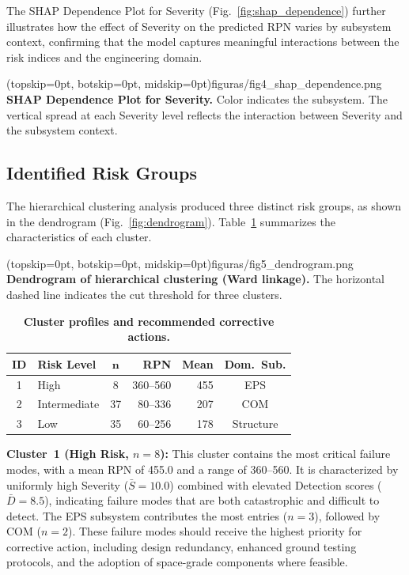The SHAP Dependence Plot for Severity (Fig.~\ref{fig:shap_dependence}) further illustrates how the effect of Severity on the predicted RPN varies by subsystem context, confirming that the model captures meaningful interactions between the risk indices and the engineering domain.

\Figure[t!](topskip=0pt, botskip=0pt, midskip=0pt){figuras/fig4_shap_dependence.png}
{\textbf{SHAP Dependence Plot for Severity.} Color indicates the subsystem. The vertical spread at each Severity level reflects the interaction between Severity and the subsystem context.\label{fig:shap_dependence}}

\subsection{Identified Risk Groups}
\label{subsec:risk_groups}

The hierarchical clustering analysis produced three distinct risk groups, as shown in the dendrogram (Fig.~\ref{fig:dendrogram}). Table~\ref{tab:cluster_profiles} summarizes the characteristics of each cluster.

\Figure[t!](topskip=0pt, botskip=0pt, midskip=0pt){figuras/fig5_dendrogram.png}
{\textbf{Dendrogram of hierarchical clustering (Ward linkage).} The horizontal dashed line indicates the cut threshold for three clusters.\label{fig:dendrogram}}

\begin{table}[h]
\caption{\textbf{Cluster profiles and recommended corrective actions.}}
\label{tab:cluster_profiles}
\centering
\small
\begin{tabular}{clcrrc}
\hline
\textbf{ID} & \textbf{Risk Level} & $\boldsymbol{n}$ & \textbf{RPN} & \textbf{Mean} & \textbf{Dom.\ Sub.} \\
\hline
1 & High         & 8  & 360--560 & 455 & EPS \\
2 & Intermediate & 37 & 80--336  & 207 & COM \\
3 & Low          & 35 & 60--256  & 178 & Structure \\
\hline
\end{tabular}
\end{table}

\textbf{Cluster~1 (High Risk, $n=8$):} This cluster contains the most critical failure modes, with a mean RPN of 455.0 and a range of 360--560. It is characterized by uniformly high Severity ($\bar{S} = 10.0$) combined with elevated Detection scores ($\bar{D} = 8.5$), indicating failure modes that are both catastrophic and difficult to detect. The EPS subsystem contributes the most entries ($n=3$), followed by COM ($n=2$). These failure modes should receive the highest priority for corrective action, including design redundancy, enhanced ground testing protocols, and the adoption of space-grade components where feasible.

